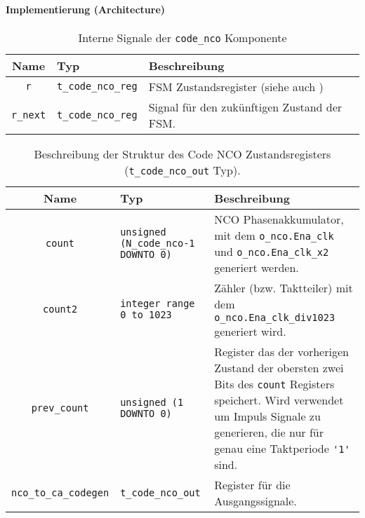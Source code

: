 \paragraph{Implementierung (Architecture)}

\begin{table}[htbp]
    \ttabbox
    {
        \caption[Code NCO interne Signale]{Interne Signale der \lstinline$code_nco$ Komponente}
        \label{TabCodeNCO_ArchSignals}
    }
    {
    \begin{tabular}{c  p{2cm} p{6cm}}
        \toprule
        Name      & Typ         & Beschreibung \\
        \midrule
        \lstinline$r$		& \lstinline$t_code_nco_reg$	& \gls{FSM} Zustandsregister (siehe auch \TR{Tab_t_code_nco_reg_Type})\\
        \lstinline$r_next$	& \lstinline$t_code_nco_reg$	& Signal für den zukünftigen Zustand der \gls{FSM}.\\
        \bottomrule
    \end{tabular}
}
\end{table}

\begin{table}[htbp]
    \ttabbox
    {
        \caption[Typdefinition Code NCO Zustandsregister]{Beschreibung der Struktur des Code NCO Zustandsregisters (\lstinline$t_code_nco_out$ Typ).}
        \label{Tab_t_code_nco_reg_Type}
    }
    {
    \begin{tabular}{c  p{2cm} p{6cm}}
        \toprule
        Name				& Typ						& Beschreibung \\
        \midrule
        \lstinline$count$		& \lstinline$unsigned (N_code_nco-1 DOWNTO 0)$	& NCO Phasenakkumulator, mit dem \lstinline$o_nco.Ena_clk$ und \lstinline$o_nco.Ena_clk_x2$ generiert werden. \\
        \lstinline$count2$		& \lstinline$integer range 0 to 1023$		& Zähler (bzw. Taktteiler) mit dem \lstinline$o_nco.Ena_clk_div1023$ generiert wird. \\
        \lstinline$prev_count$		& \lstinline$unsigned (1 DOWNTO 0)$		& Register das der vorherigen Zustand der obersten zwei Bits des  \lstinline$count$  Registers speichert. Wird verwendet um Impuls Signale zu generieren, die nur für genau eine Taktperiode \lstinline$'1'$ sind. \\
        \lstinline$nco_to_ca_codegen$	& \lstinline$t_code_nco_out$			& Register für die Ausgangssignale.\\
        \bottomrule
    \end{tabular}
}
\end{table}

